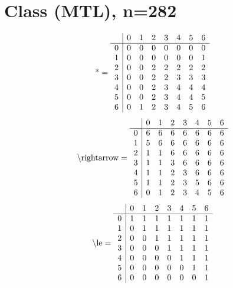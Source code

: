 \documentclass[11pt]{article}
\begin{document}
\section{Class (MTL), n=282}
\[\text{*} = 
\begin{array}{r | r r r r r r r}
 & 0 & 1 & 2 & 3 & 4 & 5 & 6 \\ \hline
0 & 0 & 0 & 0 & 0 & 0 & 0 & 0 \\
1 & 0 & 0 & 0 & 0 & 0 & 0 & 1 \\
2 & 0 & 0 & 2 & 2 & 2 & 2 & 2 \\
3 & 0 & 0 & 2 & 2 & 3 & 3 & 3 \\
4 & 0 & 0 & 2 & 3 & 4 & 4 & 4 \\
5 & 0 & 0 & 2 & 3 & 4 & 4 & 5 \\
6 & 0 & 1 & 2 & 3 & 4 & 5 & 6 \\
\end{array}
\]
\[\text{\textbackslash rightarrow} = 
\begin{array}{r | r r r r r r r}
 & 0 & 1 & 2 & 3 & 4 & 5 & 6 \\ \hline
0 & 6 & 6 & 6 & 6 & 6 & 6 & 6 \\
1 & 5 & 6 & 6 & 6 & 6 & 6 & 6 \\
2 & 1 & 1 & 6 & 6 & 6 & 6 & 6 \\
3 & 1 & 1 & 3 & 6 & 6 & 6 & 6 \\
4 & 1 & 1 & 2 & 3 & 6 & 6 & 6 \\
5 & 1 & 1 & 2 & 3 & 5 & 6 & 6 \\
6 & 0 & 1 & 2 & 3 & 4 & 5 & 6 \\
\end{array}
\]
\[\text{\textbackslash le} = 
\begin{array}{r | r r r r r r r}
 & 0 & 1 & 2 & 3 & 4 & 5 & 6 \\ \hline
0 & 1 & 1 & 1 & 1 & 1 & 1 & 1 \\
1 & 0 & 1 & 1 & 1 & 1 & 1 & 1 \\
2 & 0 & 0 & 1 & 1 & 1 & 1 & 1 \\
3 & 0 & 0 & 0 & 1 & 1 & 1 & 1 \\
4 & 0 & 0 & 0 & 0 & 1 & 1 & 1 \\
5 & 0 & 0 & 0 & 0 & 0 & 1 & 1 \\
6 & 0 & 0 & 0 & 0 & 0 & 0 & 1 \\
\end{array}
\]
\end{document}
